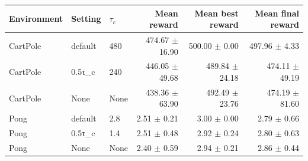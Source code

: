 \begin{tabular}{@{}lllrrr@{}}
\toprule
Environment & Setting & $\tau_c$ & Mean reward & Mean best reward & Mean final reward \\
\midrule
CartPole & default & 480 & 474.67 $\pm$ 16.90 & 500.00 $\pm$ 0.00 & 497.96 $\pm$ 4.33 \\
CartPole & 0.5τ_c & 240 & 446.05 $\pm$ 49.68 & 489.84 $\pm$ 24.18 & 474.11 $\pm$ 49.19 \\
CartPole & None & None & 438.36 $\pm$ 63.90 & 492.49 $\pm$ 23.76 & 474.19 $\pm$ 81.60 \\
Pong & default & 2.8 & 2.51 $\pm$ 0.21 & 3.00 $\pm$ 0.00 & 2.79 $\pm$ 0.66 \\
Pong & 0.5τ_c & 1.4 & 2.51 $\pm$ 0.48 & 2.92 $\pm$ 0.24 & 2.80 $\pm$ 0.63 \\
Pong & None & None & 2.40 $\pm$ 0.59 & 2.94 $\pm$ 0.21 & 2.86 $\pm$ 0.44 \\
\bottomrule
\end{tabular}

